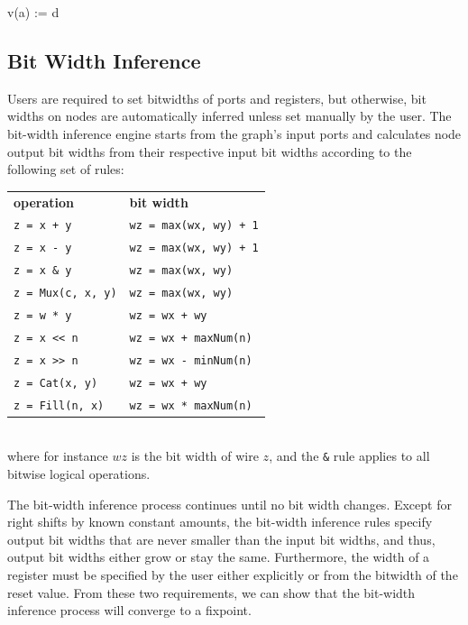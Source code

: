 \documentclass[10pt,twocolumn]{article}
\begin{document}
\begin{scala}
v(a) := d
\end{scala}


\subsection{Bit Width Inference}

Users are required to set bitwidths of ports and registers, but otherwise,
bit widths on nodes are automatically inferred unless set manually by the user.
The bit-width inference engine starts from the graph's input ports and 
calculates node output bit widths from their respective input bit widths according to the following set of rules:\\

{\small
\begin{tabular}{ll}
{\bf operation} & {\bf bit width} \\ 
\verb|z = x + y| & \verb|wz = max(wx, wy) + 1| \\
\verb+z = x - y+ & \verb|wz = max(wx, wy) + 1|\\
\verb+z = x & y+ & \verb+wz = max(wx, wy)+ \\
\verb+z = Mux(c, x, y)+ & \verb+wz = max(wx, wy)+ \\
\verb+z = w * y+ & \verb!wz = wx + wy! \\
\verb+z = x << n+ & \verb!wz = wx + maxNum(n)! \\
\verb+z = x >> n+ & \verb+wz = wx - minNum(n)+ \\
\verb+z = Cat(x, y)+ & \verb!wz = wx + wy! \\
\verb+z = Fill(n, x)+ & \verb+wz = wx * maxNum(n)+ \\
\end{tabular}
}
\\[1mm]
\noindent  
where for instance $wz$ is the bit width of wire $z$, and the \verb+&+
rule applies to all bitwise logical operations.

The bit-width inference process continues until no bit width changes.
Except for right shifts by known constant amounts, the bit-width
inference rules specify output bit widths that are never smaller than
the input bit widths, and thus, output bit widths either grow or stay
the same.  Furthermore, the width of a register must be specified by
the user either explicitly or from the bitwidth of the reset value.
From these two requirements, we can show that the bit-width inference
process will converge to a fixpoint.
\end{document}
